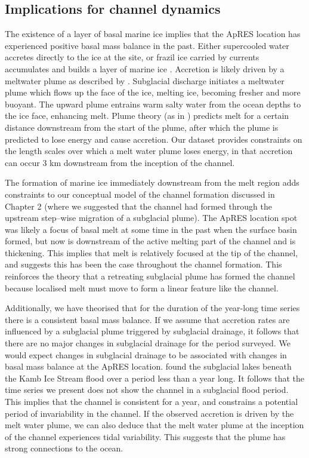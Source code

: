\subsection{Implications for channel dynamics}
The existence of a layer of basal marine ice implies that the ApRES location has experienced positive basal mass balance in the past. Either supercooled water accretes directly to the ice at the site, or frazil ice carried by currents accumulates and builds a layer of marine ice \citep{vavnkova2021nature}.  Accretion is likely driven by a meltwater plume as described by \cite{hewitt2020subglacial}. Subglacial discharge initiates a meltwater plume which flows up the face of the ice, melting ice, becoming fresher and more buoyant. The upward plume entrains warm salty water from the ocean depths to the ice face, enhancing melt. Plume theory (as in \cite{jenkins2011convection}) predicts melt for a certain distance downstream from the start of the plume, after which the plume is predicted to lose energy and cause accretion. Our dataset provides constraints on the length scales over which a melt water plume loses energy, in that accretion can occur 3 km downstream from the inception of the channel.

The formation of marine ice immediately downstream from the melt region adds constraints to our conceptual model of the channel formation discussed in Chapter 2 (where we suggested that the channel had formed through the upstream step--wise migration of a subglacial plume). The ApRES location spot was likely a focus of basal melt at some time in the past when the surface basin formed, but now is downstream of the active melting part of the channel and is thickening. This implies that melt is relatively focused at the tip of the channel, and suggests this has been the case throughout the channel formation. This reinforces the theory that a retreating subglacial plume has formed the channel because localised melt must move to form a linear feature like the channel.

Additionally, we have theorised that for the duration of the year-long time series there is a consistent basal mass balance. If we assume that accretion rates are influenced by a subglacial plume triggered by subglacial drainage, it follows that there are no major changes in subglacial drainage for the period surveyed. 
We would expect changes in subglacial drainage to be associated with changes in basal mass balance at the ApRES location. 
\cite{kim2016active} found the subglacial lakes beneath the Kamb Ice Stream flood over a period less than a year long.  It follows that the time series we present does not show the channel in a subglacial flood period. This implies that the channel is consistent for a year, and constrains a potential period of invariability in the channel.
If the observed accretion is driven by the melt water plume, we can also deduce that the melt water plume at the inception of the channel experiences tidal variability. This suggests that the plume has strong connections to the ocean.


